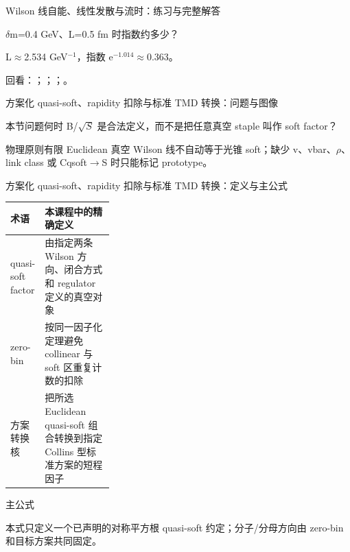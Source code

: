 \begin{frame}[t]{Wilson 线自能、线性发散与流时：练习与完整解答}
\footnotesize
\begin{block}{}\ensuremath{\delta}m=0.4 GeV、L=0.5 fm 时指数约多少？\end{block}
\begin{exampleblock}{}L\ensuremath{\approx}2.534 GeV\ensuremath{^{-1}}，指数 e\ensuremath{^{-1.014}}\ensuremath{\approx}0.363。\end{exampleblock}
\vfill
\scriptsize 回看：；；；。
\end{frame}

\begin{frame}[t]{方案化 quasi-soft、rapidity 扣除与标准 TMD 转换：问题与图像}
\footnotesize
\begin{block}{本节问题}何时 B/\allowbreak{}\ensuremath{\sqrt{S}} 是合法定义，而不是把任意真空 staple 叫作 soft factor？\end{block}
\begin{block}{物理原则}\quad 有限 Euclidean 真空 Wilson 线不自动等于光锥 soft；缺少 v、vbar、\ensuremath{\rho}、link class 或 Cqsoft\ensuremath{\rightarrow}S 时只能标记 prototype。\end{block}
\end{frame}

\begin{frame}[t]{方案化 quasi-soft、rapidity 扣除与标准 TMD 转换：定义与主公式}
\footnotesize\begin{tabularx}{\linewidth}{p{0.30\linewidth}Y}
\toprule 术语 & 本课程中的精确定义\\\midrule
{} quasi-soft factor & 由指定两条 Wilson 方向、闭合方式和 regulator 定义的真空对象\\
 zero-bin & 按同一因子化定理避免 collinear 与 soft 区重复计数的扣除\\
 方案转换核 & 把所选 Euclidean quasi-soft 组合转换到指定 Collins 型标准方案的短程因子\\
\bottomrule\end{tabularx}\vspace{0.15cm}
\begin{block}{ 主公式}\centering{}\end{block}
本式只定义一个已声明的对称平方根 quasi-soft 约定；分子/\allowbreak{}分母方向由 zero-bin 和目标方案共同固定。
\end{frame}

